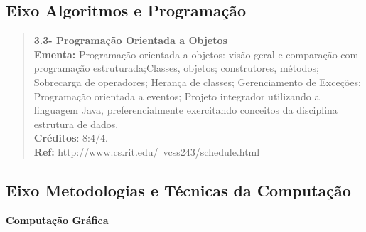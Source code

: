 \subsection{Eixo Algoritmos e Programação}


\begin{quote}
\textbf{3.3- Programação Orientada a Objetos}
\\  
\textbf{Ementa:} Programação orientada a objetos: visão geral e comparação com programação estruturada;Classes, objetos; construtores, métodos; Sobrecarga de operadores; Herança de classes; Gerenciamento de Exceções; Programação orientada a eventos; Projeto integrador utilizando a linguagem Java, preferencialmente exercitando conceitos da disciplina estrutura de dados.
\\
\textbf{Créditos}: 8:4/4.
\\
\textbf{Ref:} http://www.cs.rit.edu/~vcss243/schedule.html
\end{quote}








\subsection{Eixo Metodologias e Técnicas da Computação}


\singlespacing


\textbf{Computação Gráfica }


